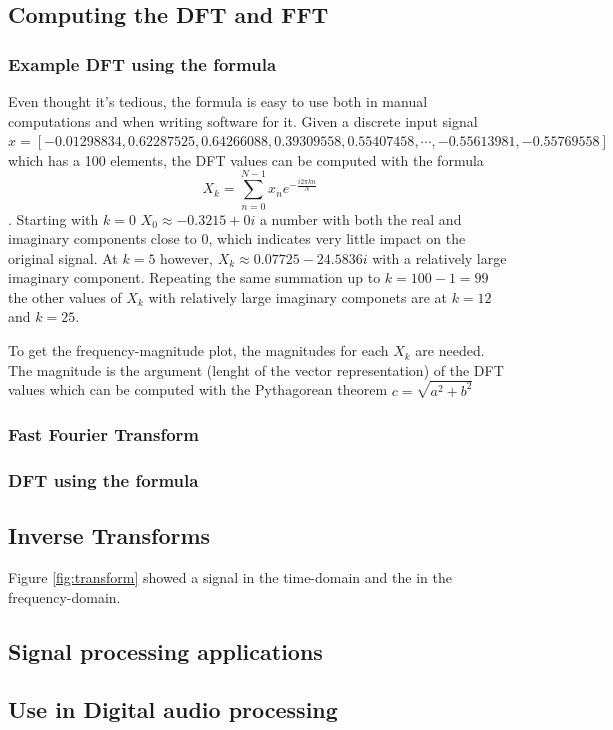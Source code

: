 \subsection{Computing the DFT and FFT}
\subsubsection{Example DFT using the formula}
Even thought it's tedious, the formula is easy to use both in manual computations and when writing software for it. Given a discrete input signal $x = [-0.01298834,  0.62287525,  0.64266088,  0.39309558,  0.55407458, \cdots , -0.55613981, -0.55769558]$ which has a 100 elements, the DFT values can be computed with the formula $$X_k = \sum_{n=0}^{N-1} x_ne^{-\frac{i2\pi kn}{N}}$$. Starting with $k=0$ $X_0 \approx -0.3215+0i$ a number with both the real and imaginary components close to 0, which indicates very little impact on the original signal. At $k=5$ however, $X_k \approx 0.07725-24.5836i$ with a relatively large imaginary component. Repeating the same summation up to $k=100-1 = 99$ the other values of $X_k$ with relatively large imaginary componets are at $k=12$ and $k=25$. 

To get the frequency-magnitude plot, the magnitudes for each $X_k$ are needed. The magnitude is the argument (lenght of the vector representation) of the DFT values which can be computed with the Pythagorean theorem $c = \sqrt{a^2 + b^2}$ 
\subsubsection{Fast Fourier Transform}
\subsubsection{DFT using the formula}

\subsection{Inverse Transforms}
Figure \ref{fig:transform} showed a signal in the time-domain and the in the frequency-domain. 

\subsection{Signal processing applications}

\subsection{Use in Digital audio processing}


